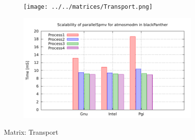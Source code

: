 \begin{figure} [ht!]
    \centering
    \captionsetup{justification=centering, singlelinecheck=false}
    \begin{subfigure}{.65\textwidth}
      \centering
      \hspace*{-3.5cm} 
      \texttt{[image: ../../matrices/Transport.png]}
      \label{fig:Transport_matrix}
    \end{subfigure}%
    \begin{subfigure}{.65\textwidth}
      \centering
      \hspace*{-6.0cm} 
      \includegraphics[page=10, width=0.95\linewidth]{../plots/blackPanther.pdf}
      \label{fig:Transport_performance}
    \end{subfigure}
\caption{Matrix: Transport}
\label{fig:Transport}
\end{figure}


\medskip
